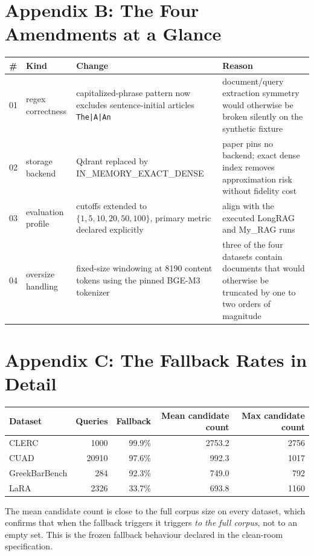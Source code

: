 \documentclass[11pt,a4paper]{article}
\begin{document}
\section{Appendix B: The Four Amendments at a Glance}
\begin{center}
\small
\begin{tabular}{p{0.6cm} p{3.6cm} p{5.0cm} p{4.5cm}}
\toprule
\textbf{\#} & \textbf{Kind} & \textbf{Change} & \textbf{Reason} \\
\midrule
01 & regex correctness &
  capitalized-phrase pattern now excludes sentence-initial
  articles \texttt{The|A|An} &
  document/query extraction symmetry would otherwise be broken
  silently on the synthetic fixture \\
02 & storage backend &
  Qdrant replaced by IN\_MEMORY\_EXACT\_DENSE &
  paper pins no backend; exact dense index removes approximation
  risk without fidelity cost \\
03 & evaluation profile &
  cutoffs extended to $\{1,5,10,20,50,100\}$, primary metric
  declared explicitly &
  align with the executed LongRAG and My\_RAG runs \\
04 & oversize handling &
  fixed-size windowing at \num{8190} content tokens using the
  pinned BGE-M3 tokenizer &
  three of the four datasets contain documents that would otherwise
  be truncated by one to two orders of magnitude \\
\bottomrule
\end{tabular}
\end{center}

\section{Appendix C: The Fallback Rates in Detail}
\begin{center}
\small
\begin{tabular}{l r r r r}
\toprule
\textbf{Dataset} & \textbf{Queries} & \textbf{Fallback}
  & \textbf{Mean candidate count} & \textbf{Max candidate count} \\
\midrule
CLERC              & \num{1000}  & \num{99.9}\%
                   & \num{2753.2} & \num{2756} \\
CUAD               & \num{20910} & \num{97.6}\%
                   & \num{992.3}  & \num{1017} \\
GreekBarBench      & \num{284}   & \num{92.3}\%
                   & \num{749.0}  & \num{792} \\
LaRA               & \num{2326}  & \num{33.7}\%
                   & \num{693.8}  & \num{1160} \\
\bottomrule
\end{tabular}
\end{center}

The mean candidate count is close to the full corpus size on every
dataset, which confirms that when the fallback triggers it triggers
\emph{to the full corpus}, not to an empty set. This is the frozen
fallback behaviour declared in the clean-room specification.
\end{document}
